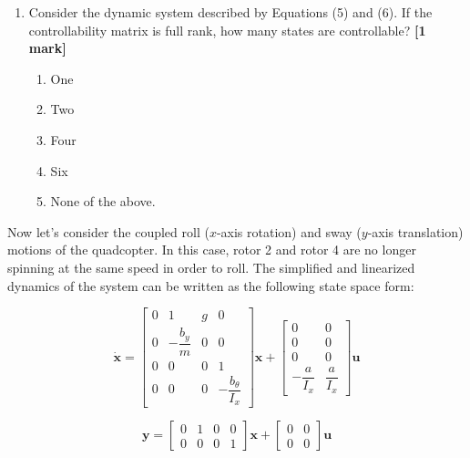 \documentclass{article}
\begin{document}
\begin{enumerate}[resume]
\begin{enumerate}[label=\alph*.]
        \item $\begin{bmatrix} z \\ \varphi \end{bmatrix}$
        \vspace{2mm}

        \item None of the above.
    \end{enumerate}

    \vspace{0.5cm}

    \item Consider the dynamic system described by Equations (5) and (6). If the controllability matrix is full rank, how many states are controllable? \hfill \textbf{[1 mark]}
    \begin{enumerate}[label=\alph*.]
        \item One
        \item Two
        \item Four
        \item Six
        \item None of the above.
    \end{enumerate}
\end{enumerate}

Now let's consider the coupled roll ($x$-axis rotation) and sway ($y$-axis translation) motions of the quadcopter. In this case, rotor 2 and rotor 4 are no longer spinning at the same speed in order to roll. The simplified and linearized dynamics of the system can be written as the following state space form:

\begin{equation}
\dot{\mathbf{x}} = \begin{bmatrix} 
0 & 1 & g & 0 \\ 
0 & -\dfrac{b_y}{m} & 0 & 0 \\ 
0 & 0 & 0 & 1 \\ 
0 & 0 & 0 & -\dfrac{b_\theta}{I_x} 
\end{bmatrix} \mathbf{x} + 
\begin{bmatrix} 
0 & 0 \\ 
0 & 0 \\ 
0 & 0 \\ 
-\dfrac{a}{I_x} & \dfrac{a}{I_x} 
\end{bmatrix} \mathbf{u}
\end{equation}

\begin{equation}
\mathbf{y} = \begin{bmatrix} 
0 & 1 & 0 & 0 \\ 
0 & 0 & 0 & 1 
\end{bmatrix} \mathbf{x} + 
\begin{bmatrix} 
0 & 0 \\ 
0 & 0 
\end{bmatrix} \mathbf{u}
\end{equation}
\end{document}

